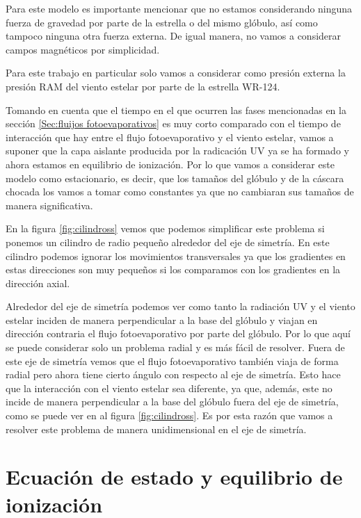 \documentclass{book}
\begin{document}
Para este modelo es importante mencionar que no estamos considerando ninguna fuerza de gravedad por parte de la estrella o del mismo glóbulo, así como tampoco ninguna otra fuerza externa. De igual manera, no vamos a considerar campos magnéticos por simplicidad.

Para este trabajo en particular solo vamos a considerar como presión externa la presión RAM del viento estelar por parte de la estrella WR-124.

Tomando en cuenta que el tiempo en el que ocurren las fases mencionadas en la sección \ref{Sec:fluijos fotoevaporativos} es muy corto comparado con el tiempo de interacción que hay entre el flujo fotoevaporativo y el viento estelar, vamos a suponer que la capa aislante producida por la radicación UV ya se ha formado y ahora estamos en equilibrio de ionización. Por lo que vamos a considerar este modelo como estacionario, es decir, que los tamaños del glóbulo y de la cáscara chocada los vamos a tomar como constantes ya que no cambiaran sus tamaños de manera significativa.

En la figura \ref{fig:cilindross} vemos que podemos simplificar este problema si ponemos un cilindro de radio pequeño alrededor del eje de simetría.  En este cilindro podemos ignorar los movimientos transversales ya que los gradientes en estas direcciones son muy pequeños si los comparamos con los gradientes en la dirección axial. 

Alrededor del eje de simetría podemos ver como tanto la radiación UV y el viento estelar inciden de manera perpendicular a la base del glóbulo y viajan en dirección contraria el flujo fotoevaporativo por parte del glóbulo. Por lo que aquí se puede considerar solo un problema radial y es más fácil de resolver. Fuera de este eje de simetría vemos que el flujo fotoevaporativo también viaja de forma radial pero ahora tiene cierto ángulo con respecto al eje de simetría. Esto hace que la interacción con el viento estelar sea diferente, ya que, además, este no incide de manera perpendicular a la base del glóbulo fuera del eje de simetría, como se puede ver en al figura  \ref{fig:cilindross}. Es por esta razón que vamos a resolver este problema de manera unidimensional en el eje de simetría.


\section{Ecuación de estado y equilibrio de ionización}
\end{document}
